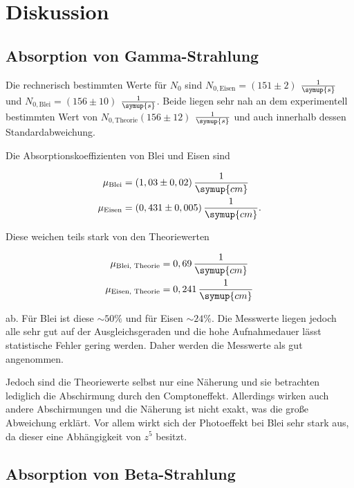 \section{Diskussion}
\label{sec:Diskussion}

\subsection{Absorption von Gamma-Strahlung}

Die rechnerisch bestimmten Werte für $N_0$ sind $N_{0,\text{Eisen}} = (151 \pm 2)$ $\frac{1}{\symup{s}}$ und $N_{0,\text{Blei}} = (156 \pm 10)$ $\frac{1}{\symup{s}}$. 
Beide liegen sehr nah an dem experimentell bestimmten Wert von $N_{0,\text{Theorie}} (156 \pm 12)$ $\frac{1}{\symup{s}}$ und auch innerhalb dessen Standardabweichung.

Die Absorptionskoeffizienten von Blei und Eisen sind

\begin{align*}
    \mu_\text{Blei} &= (1,03 \pm 0,02) \, \frac{1}{\symup{cm}}\\
    \mu_\text{Eisen} &= (0,431 \pm 0,005) \, \frac{1}{\symup{cm}}.
\end{align*}

Diese weichen teils stark von den Theoriewerten

\begin{align*}
    \mu_\text{Blei, Theorie} &= 0,69 \, \frac{1}{\symup{cm}}\\
    \mu_\text{Eisen, Theorie} &= 0,241 \, \frac{1}{\symup{cm}}
\end{align*}

ab. Für Blei ist diese $\sim \! 50\%$ und für Eisen $\sim \! 24\%$.
Die Messwerte liegen jedoch alle sehr gut auf der Ausgleichsgeraden und die hohe Aufnahmedauer lässt statistische Fehler gering werden.
Daher werden die Messwerte als gut angenommen.

Jedoch sind die Theoriewerte selbst nur eine Näherung und sie betrachten lediglich die Abschirmung durch den Comptoneffekt.
Allerdings wirken auch andere Abschirmungen und die Näherung ist nicht exakt, was die große Abweichung erklärt.
Vor allem wirkt sich der Photoeffekt bei Blei sehr stark aus, da dieser eine Abhängigkeit von $z^5$ besitzt.



\subsection{Absorption von Beta-Strahlung}

